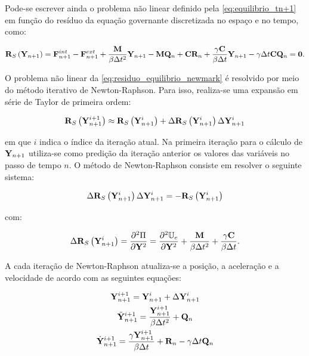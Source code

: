 Pode-se escrever ainda o problema não linear definido pela \autoref{eq:equilibrio_tn+1} em função do resíduo da equação governante
discretizada no espaço e no tempo, como:

\begin{gather}
\mathbf{R}_S\left(\mathbf{Y}_{n+1}\right) = \mathbf{F}^{int}_{n+1}- \mathbf{F}^{ext}_{n+1} + \frac{\mathbf{M}}{\beta \Delta t^2} \mathbf{Y}_{n+1}-\mathbf{M} \mathbf{Q}_n+ \mathbf{C}\mathbf{R}_n + \frac{\gamma \mathbf{C}}{\beta \Delta t}\mathbf{Y}_{n+1} - \gamma\Delta t \mathbf{C}\mathbf{Q}_n= \mathbf{0}.
\label{eq:residuo_equilibrio_newmark}
\end{gather}

O problema não linear da \autoref{eq:residuo_equilibrio_newmark} é resolvido por meio do método iterativo de Newton-Raphson. Para isso, realiza-se uma expansão em série de Taylor de primeira ordem:

\begin{gather}
\mathbf{R}_S\left(\mathbf{Y}_{n+1}^{i+1}\right) \approx \mathbf{R}_S\left(\mathbf{Y}_{n+1}^{i}\right) + \Delta\mathbf{R}_S\left(\mathbf{Y}_{n+1}^{i}\right)\Delta\mathbf{Y}_{n+1}^{i} 
\end{gather}

\noindent em que $i$ indica o índice da iteração atual. Na primeira iteração para o cálculo de $\mathbf{Y}_{n+1}$ utiliza-se como predição da iteração anterior os valores das variáveis no passo de tempo $n$. O método de Newton-Raphson consiste em resolver o seguinte sistema:

\begin{gather}
\Delta\mathbf{R}_S\left(\mathbf{Y}_{n+1}^{i}\right)\Delta\mathbf{Y}_{n+1}^{i} = -\mathbf{R}_S\left(\mathbf{Y}_{n+1}^{i}\right) \label{eq:NR}
\end{gather}

\noindent com:

\begin{gather}
\Delta\mathbf{R}_S\left(\mathbf{Y}_{n+1}^{i}\right) = \frac{\partial^{2}\Pi}{\partial\mathbf{Y}^{2}} = \frac{\partial^{2}\mathbb{U}_e}{\partial \mathbf{Y}^{2}} + \frac{\mathbf{M}}{\beta \Delta t^2} + \frac{\gamma \mathbf{C}}{\beta \Delta t}.
\end{gather}

A cada iteração de Newton-Raphson atualiza-se a posição, a aceleração e a velocidade de acordo com as seguintes equações:

\begin{gather}
\mathbf{Y}_{n+1}^{i+1} = \mathbf{Y}_{n+1}^{i} + \Delta\mathbf{Y}_{n+1}^{i} \label{UD1}\\
\ddot{\mathbf{Y}}_{n+1}^{i+1} = \frac{\mathbf{Y}_{n+1}^{i+1}}{\beta \Delta t^2} + \mathbf{Q}_n  \label{UD2} \\
\dot{\mathbf{Y}}_{n+1}^{i+1} = \frac{\gamma \mathbf{Y}_{n+1}^{i+1}}{\beta \Delta t} + \mathbf{R}_n - \gamma\Delta t \mathbf{Q}_n  \label{UD3}
\end{gather}

